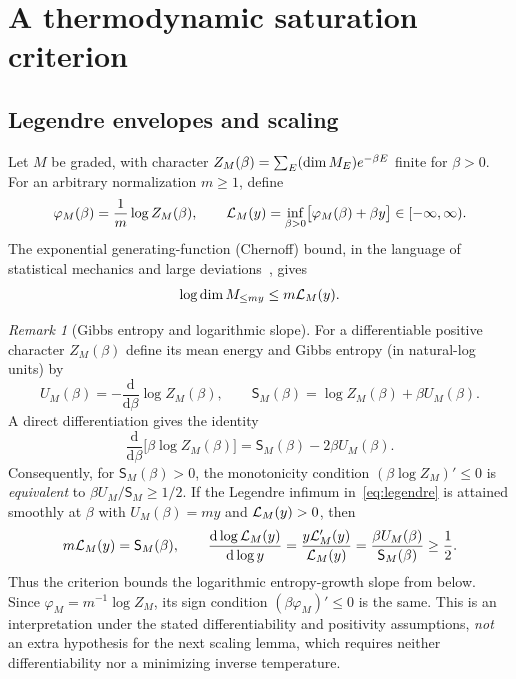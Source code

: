 \documentclass[10pt,a4paper]{article}
\numberwithin{equation}{section}
\theoremstyle{remark}\newtheorem{remark}[theorem]{Remark}\newtheorem{question}[theorem]{Question}
\newcommand{\dd}{\mathrm d}
\begin{document}
\section{A thermodynamic saturation criterion}\label{sec:thermal}
\subsection{Legendre envelopes and scaling}
Let $M$ be graded, with character $Z_M(\beta)=\sum_E(\operatorname{dim} M_E)e^{-\beta E}$ finite for $\beta>0$. For an arbitrary normalization $m\ge1$, define
\begin{equation}\label{eq:legendre}
\varphi_M(\beta)=\frac1m\log Z_M(\beta),\qquad
\mathcal L_M(y)=\inf_{\beta>0}\bigl[\varphi_M(\beta)+\beta y\bigr]\in[-\infty,\infty).
\end{equation}
The exponential generating-function (Chernoff) bound, in the language of
statistical mechanics and large deviations~\cite{ellis}, gives
\begin{equation}\label{eq:chernoff}
\log\operatorname{dim} M_{\le my}\le m\mathcal L_M(y).
\end{equation}
\begin{remark}[Gibbs entropy and logarithmic slope]\label{rem:entropy-slope}
For a differentiable positive character $Z_M(\beta)$ define its mean energy and Gibbs entropy (in natural-log units) by
\[
U_M(\beta)=-\frac{\dd}{\dd\beta}\log Z_M(\beta),\qquad
\mathsf S_M(\beta)=\log Z_M(\beta)+\beta U_M(\beta).
\]
A direct differentiation gives the identity
\begin{equation}\label{eq:entropy-slope}
\frac{\dd}{\dd\beta}\bigl[\beta\log Z_M(\beta)\bigr]
=\mathsf S_M(\beta)-2\beta U_M(\beta).
\end{equation}
Consequently, for $\mathsf S_M(\beta)>0$, the monotonicity condition
$(\beta\log Z_M)'\le0$ is \emph{equivalent} to
$\beta U_M/\mathsf S_M\ge1/2$. If the Legendre infimum in~\eqref{eq:legendre} is attained smoothly at $\beta$ with $U_M(\beta)=my$ and $\mathcal L_M(y)>0$, then
\[
m\cB_M(y)=\mathsf S_M(\beta),\qquad
\frac{\dd\log\cB_M(y)}{\dd\log y}
=\frac{y\cB'_M(y)}{\cB_M(y)}
=\frac{\beta U_M(\beta)}{\mathsf S_M(\beta)}\ge\frac12.
\]
Thus the criterion bounds the logarithmic entropy-growth slope from below. Since $\varphi_M=m^{-1}\log Z_M$, its sign condition $(\beta\varphi_M)'\le0$ is the same. This is an interpretation under the stated differentiability and positivity assumptions, \emph{not} an extra hypothesis for the next scaling lemma, which requires neither differentiability nor a minimizing inverse temperature.
\end{remark}
\end{document}
